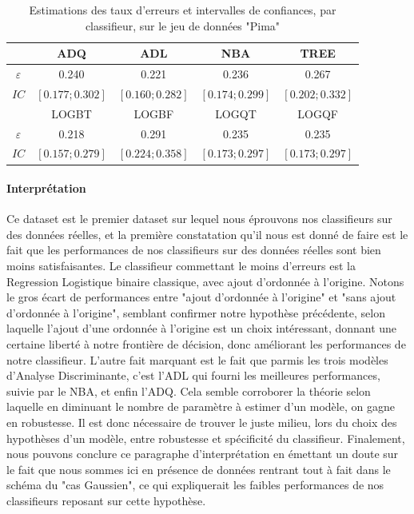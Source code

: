 \documentclass{report}
\begin{document}
\begin{table}[h!]
    \centering
    \caption{Estimations des taux d'erreurs et intervalles de confiances, par classifieur, sur le jeu de données "Pima"}
    \label{tab:table1}
    \def\arraystretch{1.5}
    \begin{tabular}{c||c|c|c|c}
        \hline
        & ADQ & ADL & NBA & TREE\\
        \hline
        $\varepsilon$ & 0.240 & 0.221 & 0.236
        & 0.267\\
        \hline
        $IC$ & $[0.177 ; 0.302]$ & $[0.160; 0.282]$ & $[0.174 ; 0.299]$
        & $[0.202 ; 0.332]$\\
        \hline
        \hline
        & LOGBT & LOGBF & LOGQT & LOGQF\\
        \hline
        $\varepsilon$ & 0.218 & 0.291 & 0.235 & 0.235\\
        \hline
        $IC$ & $[0.157 ; 0.279]$ & $[0.224 ; 0.358]$ & $[0.173 ; 0.297]$ & $[0.173 ; 0.297]$\\
        \hline
        \hline
    \end{tabular}
\end{table}

\paragraph{Interprétation}
Ce dataset est le premier dataset sur lequel nous éprouvons nos classifieurs sur des données réelles, et la première constatation qu'il nous est donné de faire est le fait que les performances de nos classifieurs sur des données réelles sont bien moins satisfaisantes. Le classifieur commettant le moins d'erreurs est la Regression Logistique binaire classique, avec ajout d'ordonnée à l'origine. Notons le gros écart de performances entre "ajout d'ordonnée à l'origine" et "sans ajout d'ordonnée à l'origine", semblant confirmer notre hypothèse précédente, selon laquelle l'ajout d'une ordonnée à l'origine est un choix intéressant, donnant une certaine liberté à notre frontière de décision, donc améliorant les performances de notre classifieur. L'autre fait marquant est le fait que parmis les trois modèles d'Analyse Discriminante, c'est l'ADL qui fourni les meilleures performances, suivie par le NBA, et enfin l'ADQ. Cela semble corroborer la théorie selon laquelle en diminuant le nombre de paramètre à estimer d'un modèle, on gagne en robustesse. Il est donc nécessaire de trouver le juste milieu, lors du choix des hypothèses d'un modèle, entre robustesse et spécificité du classifieur. Finalement, nous pouvons conclure ce paragraphe d'interprétation en émettant un doute sur le fait que nous sommes ici en présence de données rentrant tout à fait dans le schéma du "cas Gaussien", ce qui expliquerait les faibles performances de nos classifieurs reposant sur cette hypothèse.
\end{document}
